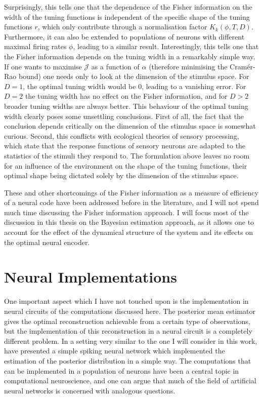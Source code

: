 Surprisingly, this tells one that the dependence of the Fisher information on the width of the tuning functions is independent of the specific shape of the tuning functions $r$, which only
contribute through a normalisation factor $K_k(\phi,T,D)$. Furthermore, it can also be extended to populations of neurons with different maximal firing rates $\phi$, leading to a 
similar result. Interestingly, this tells one that the Fisher information depends on the tuning width in a remarkably simple 
way. If one wants to maximise $\mathcal{J}$ as a function of $\alpha$ (therefore minimising the Cram\'{e}r-Rao bound) one needs only to look at the dimension of the 
stimulus space. For $D=1$, the optimal tuning width would be $0$, leading to a vanishing error. For $D=2$ the tuning width has no effect on the Fisher information, and for $D>2$ 
broader tuning widths are always 
better. This behaviour of the optimal tuning width clearly poses some unsettling conclusions. First of all, the fact that the conclusion depends critically on the dimension of the stimulus 
space is somewhat curious. Second, this conflicts with ecological theories of sensory processing, which state that the response functions of sensory neurons are adapted to the 
statistics of the stimuli they respond to. The formulation above leaves no room for an influence of the environment on the shape of the tuning functions,
their optimal shape being dictated solely by the dimension of the stimulus space.
\par

These and other shortcomings of the Fisher information as a measure of efficiency of a neural code have been addressed before in the literature,
and I will not spend much time discussing
the Fisher information approach. I will focus most of the discussion in this thesis on the Bayesian estimation approach, as it allows one to account for the effect
of the dynamical structure of the system and its effects on the optimal neural encoder.
\par

\section{Neural Implementations}

One important aspect which I have not touched upon is the implementation in neural circuits of the computations discussed here. The posterior mean estimator gives the optimal 
reconstruction achievable from a certain type of observations, but the implementation of this reconstruction in a neural circuit
is a completely different problem.  In a setting very similar to the one I will consider in this
work,  have presented a simple spiking neural network which implemented the estimation of the posterior distribution in a simple way.
The computations that can be implemented in a population of neurons have been a central topic in computational neuroscience, and
one can argue that much of the field of artificial neural networks is concerned with analogous questions.
\par

